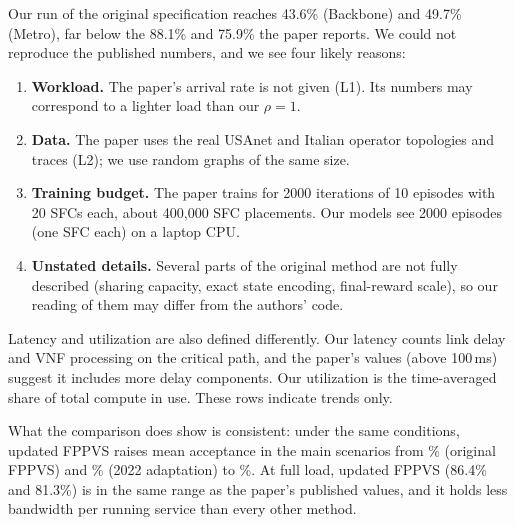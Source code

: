 Our run of the original specification reaches 43.6\% (Backbone) and 49.7\%
(Metro), far below the 88.1\% and 75.9\% the paper reports. We could not
reproduce the published numbers, and we see four likely reasons:
\begin{enumerate}
  \item \textbf{Workload.} The paper's arrival rate is not given (L1). Its
  numbers may correspond to a lighter load than our $\rho=1$.
  \item \textbf{Data.} The paper uses the real USAnet and Italian operator
  topologies and traces (L2); we use random graphs of the same size.
  \item \textbf{Training budget.} The paper trains for 2000 iterations of 10
  episodes with 20 SFCs each, about 400{,}000 SFC placements. Our models see
  2000 episodes (one SFC each) on a laptop CPU.
  \item \textbf{Unstated details.} Several parts of the original method are not
  fully described (sharing capacity, exact state encoding, final-reward scale),
  so our reading of them may differ from the authors' code.
\end{enumerate}
Latency and utilization are also defined differently. Our latency counts link
delay and VNF processing on the critical path, and the paper's values (above
100\,ms) suggest it includes more delay components. Our utilization is the
time-averaged share of total compute in use. These rows indicate trends only.

What the comparison does show is consistent: under the same conditions, updated
FPPVS raises mean acceptance in the main scenarios from \origMeanAcc\% (original
FPPVS) and \zhangMeanAcc\% (2022 adaptation) to \fppvsMeanAcc\%. At full load,
updated FPPVS (86.4\% and 81.3\%) is in the same range as the paper's published
values, and it holds less bandwidth per running service than every other method.

